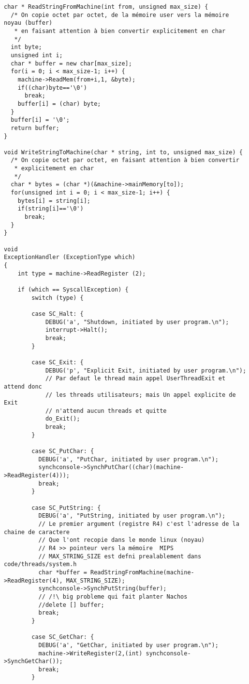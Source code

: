 \documentclass[a4paper,10pt]{article}
\begin{document}
\begin{lstlisting}
char * ReadStringFromMachine(int from, unsigned max_size) {
  /* On copie octet par octet, de la mémoire user vers la mémoire noyau (buffer)
   * en faisant attention à bien convertir explicitement en char
   */
  int byte;
  unsigned int i;
  char * buffer = new char[max_size];
  for(i = 0; i < max_size-1; i++) {
    machine->ReadMem(from+i,1, &byte);
    if((char)byte=='\0')
      break;
    buffer[i] = (char) byte;
  }
  buffer[i] = '\0';
  return buffer;
}

void WriteStringToMachine(char * string, int to, unsigned max_size) {
  /* On copie octet par octet, en faisant attention à bien convertir
   * explicitement en char
   */
  char * bytes = (char *)(&machine->mainMemory[to]);
  for(unsigned int i = 0; i < max_size-1; i++) {
    bytes[i] = string[i];
    if(string[i]=='\0')
      break;
  }
}

void
ExceptionHandler (ExceptionType which)
{
    int type = machine->ReadRegister (2);

    if (which == SyscallException) {
        switch (type) {

        case SC_Halt: {
            DEBUG('a', "Shutdown, initiated by user program.\n");
            interrupt->Halt();
            break;
        }

        case SC_Exit: {
            DEBUG('p', "Explicit Exit, initiated by user program.\n");
            // Par defaut le thread main appel UserThreadExit et attend donc
            // les threads utilisateurs; mais Un appel explicite de Exit
            // n'attend aucun threads et quitte
            do_Exit();
            break;
        }

        case SC_PutChar: {
          DEBUG('a', "PutChar, initiated by user program.\n");
          synchconsole->SynchPutChar((char)(machine->ReadRegister(4)));
          break;
        }

        case SC_PutString: {
          DEBUG('a', "PutString, initiated by user program.\n");
          // Le premier argument (registre R4) c'est l'adresse de la chaine de caractere
          // Que l'ont recopie dans le monde linux (noyau)
          // R4 >> pointeur vers la mémoire  MIPS
          // MAX_STRING_SIZE est defni prealablement dans code/threads/system.h
          char *buffer = ReadStringFromMachine(machine->ReadRegister(4), MAX_STRING_SIZE);
          synchconsole->SynchPutString(buffer);
          // /!\ big probleme qui fait planter Nachos
          //delete [] buffer;
          break;
        }

        case SC_GetChar: {
          DEBUG('a', "GetChar, initiated by user program.\n");
          machine->WriteRegister(2,(int) synchconsole->SynchGetChar());
          break;
        }


\end{lstlisting}
\end{document}
